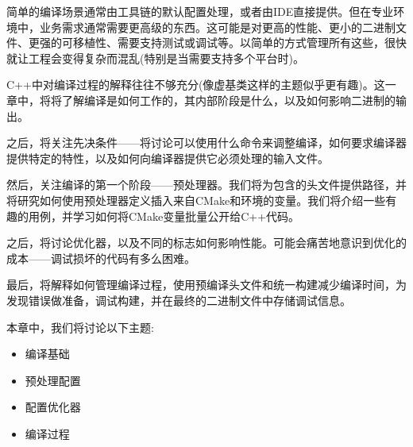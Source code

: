 简单的编译场景通常由工具链的默认配置处理，或者由IDE直接提供。但在专业环境中，业务需求通常需要更高级的东西。这可能是对更高的性能、更小的二进制文件、更强的可移植性、需要支持测试或调试等。以简单的方式管理所有这些，很快就让工程会变得复杂而混乱(特别是当需要支持多个平台时)。

C++中对编译过程的解释往往不够充分(像虚基类这样的主题似乎更有趣)。这一章中，将将了解编译是如何工作的，其内部阶段是什么，以及如何影响二进制的输出。

之后，将关注先决条件——将讨论可以使用什么命令来调整编译，如何要求编译器提供特定的特性，以及如何向编译器提供它必须处理的输入文件。

然后，关注编译的第一个阶段——预处理器。我们将为包含的头文件提供路径，并将研究如何使用预处理器定义插入来自CMake和环境的变量。我们将介绍一些有趣的用例，并学习如何将CMake变量批量公开给C++代码。

之后，将讨论优化器，以及不同的标志如何影响性能。可能会痛苦地意识到优化的成本——调试损坏的代码有多么困难。

最后，将解释如何管理编译过程，使用预编译头文件和统一构建减少编译时间，为发现错误做准备，调试构建，并在最终的二进制文件中存储调试信息。

本章中，我们将讨论以下主题:

\begin{itemize}
\item 
编译基础

\item 
预处理配置

\item 
配置优化器

\item 
编译过程
\end{itemize}
